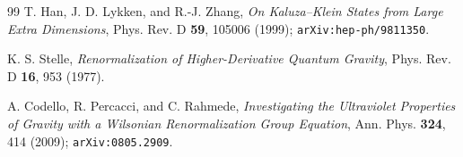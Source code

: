 \documentclass[11pt,a4paper]{article}
\begin{document}
\begin{thebibliography}{99}
T. Han, J. D. Lykken, and R.-J. Zhang,
\textit{On Kaluza--Klein States from Large Extra Dimensions},
Phys. Rev. D \textbf{59}, 105006 (1999);
\texttt{arXiv:hep-ph/9811350}.

K. S. Stelle,
\textit{Renormalization of Higher-Derivative Quantum Gravity},
Phys. Rev. D \textbf{16}, 953 (1977).

A. Codello, R. Percacci, and C. Rahmede,
\textit{Investigating the Ultraviolet Properties of Gravity with a
Wilsonian Renormalization Group Equation},
Ann. Phys. \textbf{324}, 414 (2009);
\texttt{arXiv:0805.2909}.

\end{thebibliography}
\end{document}
